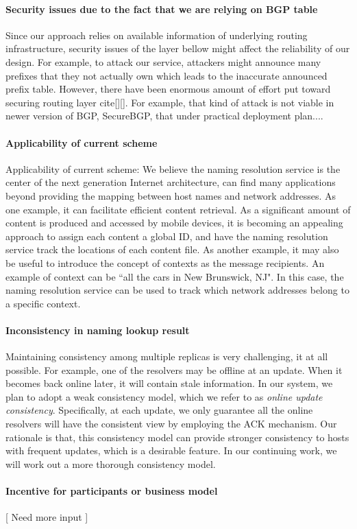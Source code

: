\paragraph{Security issues due to the fact that we are relying on BGP table}
        Since our approach relies on available information of underlying routing infrastructure, security issues of the layer bellow might affect the reliability of our design. For example, to attack our service, attackers might announce many prefixes that they not actually own which leads to the inaccurate announced prefix table. However, there have been enormous amount of effort put toward securing routing layer cite[][]. For example, that kind of attack is not viable in newer version of BGP, SecureBGP, that under practical deployment plan....


\paragraph{Applicability of current scheme}
        Applicability of current scheme: We believe the naming resolution service is the center of the next generation Internet architecture, can find many applications beyond providing the mapping between host names and network addresses. As one example, it can facilitate efficient content retrieval. As a significant amount of content is produced and accessed by mobile devices, it is becoming an appealing approach to assign each content a global ID, and have the naming resolution service track the locations of each content file. As another example, it may also be useful to introduce the concept of contexts as the message recipients. An example of context can be ``all the cars in New Brunswick, NJ". In this case, the naming resolution service can be used to track which network addresses belong to a specific context.
\paragraph{Inconsistency in naming lookup result}
        Maintaining consistency among multiple replicas is very challenging, it at all possible. For example, one of the resolvers may be offline at an update. When it becomes back online later, it will contain stale information. In our system, we plan to adopt a weak consistency model, which we refer to as \emph{online update consistency}. Specifically, at each update, we only guarantee all the online resolvers will have the consistent view by employing the ACK mechanism. Our rationale is that, this consistency model can provide stronger consistency to hosts with frequent updates, which is a desirable feature. In our continuing work, we will work out a more thorough consistency model.
\paragraph{Incentive for participants or business model}
        [ Need more input ]

